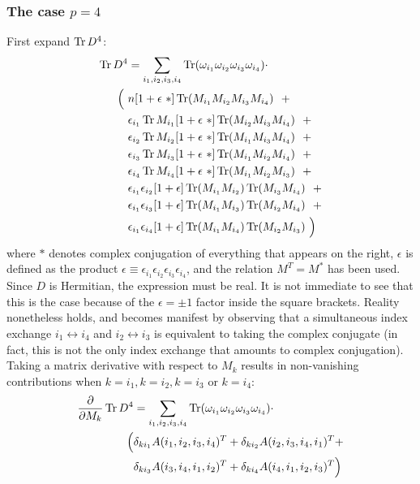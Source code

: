 \subsubsection{The case $p=4$}
First expand $\operatorname{Tr} D^4$:
\begin{align}\label{eq:trd4}
\Tr D^4 &= \sum_{i_1, i_2, i_3, i_4} \Tr (\omega_{i_1} \omega_{i_2} \omega_{i_3} \omega_{i_4}) \cdot \notag \\
\Big( \ &n [1+\epsilon \ *] \Tr (M_{i_1} M_{i_2} M_{i_3} M_{i_4})  \ \  + \notag \\
&\epsilon_{i_1} \Tr M_{i_1} [1 + \epsilon \ *] \Tr ( M_{i_2} M_{i_3} M_{i_4})  \ \  + \notag \\
&\epsilon_{i_2} \Tr M_{i_2} [1  + \epsilon \ *] \Tr (M_{i_1} M_{i_3} M_{i_4}) \ \  + \notag \\
&\epsilon_{i_3} \Tr M_{i_3} [1 + \epsilon \ *] \Tr (M_{i_1} M_{i_2} M_{i_4})  \ \  + \notag \\
&\epsilon_{i_4} \Tr M_{i_4} [1 + \epsilon \ *] \Tr (M_{i_1} M_{i_2} M_{i_3})  \ \  + \notag \\
&\epsilon_{i_1} \epsilon_{i_2} [1 + \epsilon] \Tr (M_{i_1} M_{i_2} ) \Tr (M_{i_3} M_{i_4})   \ \  + \notag \\
&\epsilon_{i_1} \epsilon_{i_3} [1 + \epsilon] \Tr (M_{i_1} M_{i_3}) \Tr (M_{i_2} M_{i_4})   \ \  + \notag \\
&\epsilon_{i_1} \epsilon_{i_4} [1 + \epsilon] \Tr (M_{i_1} M_{i_4}) \Tr (M_{i_2} M_{i_3})   \ \Big)
\end{align}
where $*$ denotes complex conjugation of everything that appears on the right, $\epsilon$ is defined as the product $\epsilon \equiv \epsilon_{i_1}\epsilon_{i_2}\epsilon_{i_3}\epsilon_{i_4}$, and the relation $M^T = M^*$ has been used. Since $D$ is Hermitian, the expression must be real. It is not immediate to see that this is the case because of the $\epsilon = \pm 1$ factor inside the square brackets. Reality nonetheless holds, and becomes manifest by observing that a simultaneous index exchange $i_1 \leftrightarrow i_4$ and $i_2 \leftrightarrow i_3$ is equivalent to taking the complex conjugate (in fact, this is not the only index exchange that amounts to complex conjugation). \newline
Taking a matrix derivative with respect to $M_k$ results in non-vanishing contributions when $k=i_1, k=i_2, k=i_3$ or $k=i_4$:
\begin{align}
\frac{\partial}{\partial M_k} \operatorname{Tr} D^4 &= \sum_{i_1, i_2, i_3, i_4} \operatorname{Tr} (\omega_{i_1} \omega_{i_2} \omega_{i_3} \omega_{i_4}) \cdot \notag \\
\Big( &\delta_{ki_1} A(i_1, i_2, i_3, i_4)^T + \delta_{ki_2} A(i_2, i_3, i_4, i_1)^T + \notag \\
&\delta_{ki_3} A(i_3, i_4, i_1, i_2)^T + \delta_{ki_4} A(i_4, i_1, i_2, i_3)^T \Big)
\end{align}
